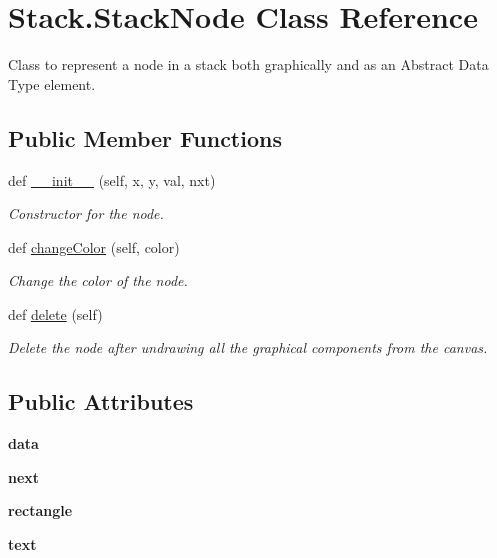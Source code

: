 \hypertarget{class_stack_1_1_stack_node}{}\section{Stack.\+Stack\+Node Class Reference}
\label{class_stack_1_1_stack_node}


Class to represent a node in a stack both graphically and as an Abstract Data Type element.  


\subsection*{Public Member Functions}
\begin{DoxyCompactItemize}
\item 
def \hyperlink{class_stack_1_1_stack_node_a1f7436ddc8e865ddf238656418285920}{\+\_\+\+\_\+init\+\_\+\+\_\+} (self, x, y, val, nxt)
\begin{DoxyCompactList}\small\item\em Constructor for the node. \end{DoxyCompactList}\item 
def \hyperlink{class_stack_1_1_stack_node_a01afb84c8c935287114b2d9bdf1d2491}{change\+Color} (self, color)
\begin{DoxyCompactList}\small\item\em Change the color of the node. \end{DoxyCompactList}\item 
def \hyperlink{class_stack_1_1_stack_node_a96f87a002abf757eb12e5496f4c20eb4}{delete} (self)
\begin{DoxyCompactList}\small\item\em Delete the node after undrawing all the graphical components from the canvas. \end{DoxyCompactList}\end{DoxyCompactItemize}
\subsection*{Public Attributes}
\begin{DoxyCompactItemize}
\item 
\mbox{\label{class_stack_1_1_stack_node_ae7e40c548b14d1cce9c061c7b657ae02}} 
{\bfseries data}
\item 
\mbox{\label{class_stack_1_1_stack_node_a227a52319c27da780ff37649e3caf356}} 
{\bfseries next}
\item 
\mbox{\label{class_stack_1_1_stack_node_a935a490cb8ef76ce8b2028ab77ba0bfc}} 
{\bfseries rectangle}
\item 
\mbox{\label{class_stack_1_1_stack_node_a29a49b0b74829df99922b1e5a364557a}} 
{\bfseries text}
\end{DoxyCompactItemize}


